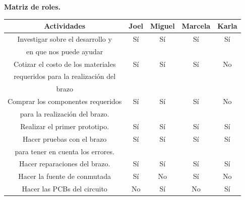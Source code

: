 \documentclass[letterpaper]{article}
\begin{document}
\begin{large}
    \begin{LARGE}
        \textbf{Matriz de roles.}\\
        
    \end{LARGE}
    

\begin{tabular}{|c|c|c|c|c|}
\hline
    Actividades                         & Joel & Miguel & Marcela & Karla       \\ \hline
    Investigar sobre el desarrollo y    & Sí   &  Sí    &      Sí &  Sí         \\   
    en que nos puede ayudar             &      &        &         &             \\ \hline
    Cotizar el costo de los materiales  & Sí   &     Sí &     Sí  & No          \\
    requeridos para la realización del  &      &        &         &             \\
    brazo                               &      &        &         &             \\\hline
    Comprar los componentes requeridos  &   Sí & Sí     &   Sí    & No          \\
    para la realización del brazo.      &      &        &         &             \\ \hline
    Realizar el primer prototipo.       & Sí   & Sí     & Sí      & Sí          \\\hline
    Hacer pruebas con el brazo          & Sí   &Sí      & Sí      & Sí           \\
    para tener en cuenta los errores.   &      &        &         &             \\\hline
    Hacer reparaciones del brazo.       & Sí   & Sí     & Sí      & Sí           \\\hline
    Hacer la fuente de conmutada & Sí & No & Sí & No
      \\\hline
    Hacer las PCBs del circuito & No  & Sí  &  No &  Sí
       \\\hline
\end{tabular}
\end{large}\\ \newpage

 
   
\end{document}
